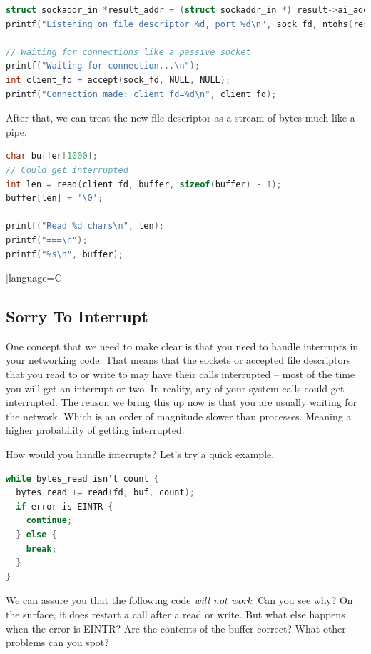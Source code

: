 \begin{lstlisting}[language=C]
struct sockaddr_in *result_addr = (struct sockaddr_in *) result->ai_addr;
printf("Listening on file descriptor %d, port %d\n", sock_fd, ntohs(result_addr->sin_port));

// Waiting for connections like a passive socket
printf("Waiting for connection...\n");
int client_fd = accept(sock_fd, NULL, NULL);
printf("Connection made: client_fd=%d\n", client_fd);
\end{lstlisting}

After that, we can treat the new file descriptor as a stream of bytes much like a pipe.

\begin{lstlisting}[language=C]
char buffer[1000];
// Could get interrupted
int len = read(client_fd, buffer, sizeof(buffer) - 1);
buffer[len] = '\0';

printf("Read %d chars\n", len);
printf("===\n");
printf("%s\n", buffer);
\end{lstlisting}[language=C]

\subsection{Sorry To Interrupt}

One concept that we need to make clear is that you need to handle interrupts in your networking code.
That means that the sockets or accepted file descriptors that you read to or write to may have their calls interrupted -- most of the time you will get an interrupt or two.
In reality, any of your system calls could get interrupted.
The reason we bring this up now is that you are usually waiting for the network.
Which is an order of magnitude slower than processes.
Meaning a higher probability of getting interrupted.

How would you handle interrupts?
Let's try a quick example.

\begin{lstlisting}[language=C]
while bytes_read isn't count {
  bytes_read += read(fd, buf, count);
  if error is EINTR {
    continue;
  } else {
    break;
  }
}
\end{lstlisting}

We can assure you that the following code \textit{will not work}.
Can you see why?
On the surface, it does restart a call after a read or write.
But what else happens when the error is EINTR?
Are the contents of the buffer correct?
What other problems can you spot?

